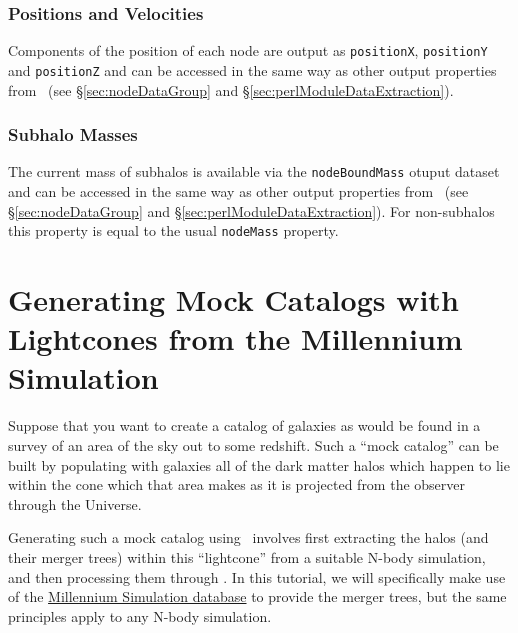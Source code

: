 \subsubsection{Positions and Velocities}

Components of the position of each node are output as {\tt positionX}, {\tt positionY} and {\tt positionZ} and can be accessed in the same way as other output properties from \glc\ (see \S\ref{sec:nodeDataGroup} and \S\ref{sec:perlModuleDataExtraction}).

\subsubsection{Subhalo Masses}

The current mass of subhalos is available via the {\tt nodeBoundMass} otuput dataset and can be accessed in the same way as other output properties from \glc\ (see \S\ref{sec:nodeDataGroup} and \S\ref{sec:perlModuleDataExtraction}). For non-subhalos this property is equal to the usual {\tt nodeMass} property.

\section{Generating Mock Catalogs with Lightcones from the Millennium Simulation}

Suppose that you want to create a catalog of galaxies as would be found in a survey of an area of the sky out to some redshift. Such a ``mock catalog'' can be built by populating with galaxies all of the dark matter halos which happen to lie within the cone which that area makes as it is projected from the observer through the Universe.

Generating such a mock catalog using \glc\ involves first extracting the halos (and their merger trees) within this ``lightcone'' from a suitable N-body simulation, and then processing them through \glc. In this tutorial, we will specifically make use of the \href{http://gavo.mpa-garching.mpg.de/MyMillennium3/MyDB}{Millennium Simulation database} to provide the merger trees, but the same principles apply to any N-body simulation.

